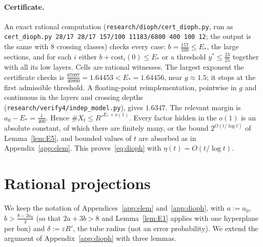 \documentclass[aps,prx,twocolumn,superscriptaddress,nofootinbib,longbibliography]{revtex4-2}
\theoremstyle{plain}
\theoremstyle{definition}
\theoremstyle{remark}
\begin{document}
\paragraph{Certificate.} {\raggedright An exact rational computation (\texttt{research/dioph/cert\_dioph.py}, run as \texttt{cert\_dioph.py 28/17 28/17 157/100 11183/6800 400 100 12}; the output is the same with $8$ crossing classes) checks every case: $b=\tfrac{157}{100}\le E_*$, the large sections, and for each $i$ either $b+\mathrm{cost}_i(0)\le E_*$ or a threshold $y^*\le\tfrac{23}{25}$ together with all its low layers. Cells are rational witnesses. The largest exponent the certificate checks is $\tfrac{67097}{40800}=1.64453<E_*=1.64456$, near $g\approx1.5$; it stops at the first admissible threshold. A floating-point reimplementation, pointwise in $g$ and continuous in the layers and crossing depths (\texttt{research/verify4/indep\_model.py}), gives $1.6347$. The relevant margin is $a_0-E_*=\tfrac1{400}$. Hence $\#X_t\le R'^{E_*+o(1)}$. Every factor hidden in the $o(1)$ is an absolute constant, of which there are finitely many, or the bound $2^{O(t/\log t)}$ of Lemma~\ref{lem:E5}, and bounded values of $t$ are absorbed as in Appendix~\ref{app:elem}. This proves~\eqref{eq:dioph} with $\eta(t)=O(t/\log t)$.\par}

\section{Rational projections}\label{app:proj}

We keep the notation of Appendices~\ref{app:elem} and~\ref{app:dioph}, with $a:=a_0$, $b>\tfrac{8-2a_0}3$ (so that $2a+3b>8$ and Lemma~\ref{lem:E1} applies with one hyperplane per box) and $\delta:=\varepsilon R'$, the tube radius (not an error probability). We extend the argument of Appendix~\ref{app:dioph} with three lemmas.
\end{document}
